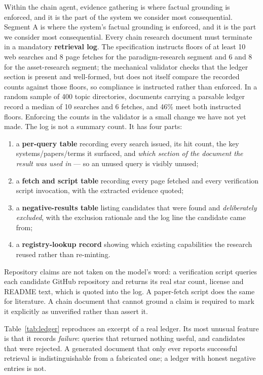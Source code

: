 \documentclass[10pt,a4paper]{article}
\begin{document}
Within the chain agent, evidence gathering is where factual grounding is enforced,
and it is the part of the system we consider most consequential.
Segment A is where the system's factual grounding is enforced, and it is the part
we consider most consequential. Every chain research document must terminate in a
mandatory \textbf{retrieval log}. The specification instructs floors of at least 10
web searches and 8 page fetches for the paradigm-research segment and 6 and 8 for
the asset-research segment; the mechanical validator checks that the ledger section
is present and well-formed, but does not itself compare the recorded counts against
those floors, so compliance is instructed rather than enforced. In a random sample
of 400 topic directories, documents carrying a parsable ledger record a median of 10
searches and 6 fetches, and 46\% meet both instructed floors. Enforcing the counts
in the validator is a small change we have not yet made. The log is not a summary count. It has four parts:

\begin{enumerate}[leftmargin=1.4em,itemsep=2pt]
\item a \textbf{per-query table} recording every search issued, its hit count, the
  key systems/papers/terms it surfaced, and \emph{which section of the document
  the result was used in} --- so an unused query is visibly unused;
\item a \textbf{fetch and script table} recording every page fetched and every
  verification script invocation, with the extracted evidence quoted;
\item a \textbf{negative-results table} listing candidates that were found and
  \emph{deliberately excluded}, with the exclusion rationale and the log line the
  candidate came from;
\item a \textbf{registry-lookup record} showing which existing capabilities the
  research reused rather than re-minting.
\end{enumerate}

Repository claims are not taken on the model's word: a verification script
queries each candidate GitHub repository and returns its real star count, license
and README text, which is quoted into the log. A paper-fetch script does the same
for literature. A chain document that cannot ground a claim is required to mark
it explicitly as unverified rather than assert it.

Table~\ref{tab:ledger} reproduces an excerpt of a real ledger. Its most unusual
feature is that it records \emph{failure}: queries that returned nothing useful,
and candidates that were rejected. A generated document that only ever reports
successful retrieval is indistinguishable from a fabricated one; a ledger with
honest negative entries is not.
\end{document}
